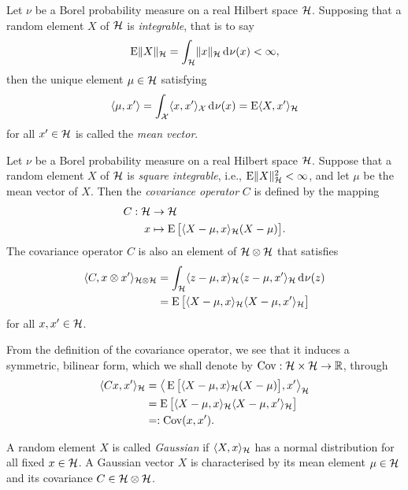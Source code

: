\begin{definition}
  Let $\nu$ be a Borel probability measure on a real Hilbert space ${\mathcal H}$.
  Supposing that a random element $X$ of ${\mathcal H}$ is \emph{integrable}, that is to say
  \[
    \operatorname{E} \lVert X\rVert_{\mathcal H} = \int_{\mathcal H} \lVert x\rVert_{\mathcal H} \operatorname{d}\hspace{0.5pt}\!\nu(x) < \infty,
  \]
  then the unique element $\mu\in{\mathcal H}$ satisfying 
  \[
    \langle\mu,x'\rangle = \int_{\mathcal X} \langle x,x'\rangle_{\mathcal X} \operatorname{d}\hspace{0.5pt}\!\nu(x) = \operatorname{E}\langle X,x'\rangle_{\mathcal H}
  \]
  for all $x' \in {\mathcal H}$ is called the \emph{mean vector}. 
\end{definition}

\begin{definition}
  Let $\nu$ be a Borel probability measure on a real Hilbert space ${\mathcal H}$.
  Suppose that a random element $X$ of ${\mathcal H}$ is \emph{square integrable}, i.e., $\operatorname{E} \lVert X\rVert_{\mathcal H}^2 < \infty$, and let $\mu$ be the mean vector of $X$.
  Then the \emph{covariance operator} $C$ is defined by the mapping
  \begin{align*}
    C:{\mathcal H} &\to {\mathcal H} \\
    x &\mapsto \operatorname{E}\big[\langle X - \mu, x\rangle_{{\mathcal H}}(X - \mu) \big].
  \end{align*}
  The covariance operator $C$ is also an element of ${\mathcal H}\otimes{\mathcal H}$ that satisfies
  \begin{align*}
    \langle C,x\otimes x'\rangle_{{\mathcal H}\otimes{\mathcal H}} 
    &= \int_{\mathcal H} \langle z-\mu, x\rangle_{\mathcal H}\langle z-\mu,x'\rangle_{\mathcal H} \operatorname{d}\hspace{0.5pt}\!\nu(z) \\
    &= \operatorname{E}\big[\langle X-\mu,x\rangle_{\mathcal H} \langle X-\mu,x'\rangle_{\mathcal H}\big]
  \end{align*}
  for all $x,x'\in{\mathcal H}$.
\end{definition}

From the definition of the covariance operator, we see that it induces a symmetric, bilinear form, which we shall denote by $\operatorname{Cov}:{\mathcal H}\times{\mathcal H}\to\mathbb{R}$, through
\begin{align*}
  \langle Cx,x'\rangle_{\mathcal H} 
  &= \big\langle\operatorname{E}\big[\langle X - \mu, x\rangle_{{\mathcal H}}(X - \mu) \big], x' \big\rangle_{\mathcal H} \\
  &= \operatorname{E}\big[\langle X-\mu,x\rangle_{\mathcal H} \langle X-\mu,x'\rangle_{\mathcal H}\big] \\
  &=: \operatorname{Cov}(x,x').
\end{align*}

\begin{definition}
  A random element $X$ is called \emph{Gaussian} if $\langle X,x\rangle_{\mathcal H}$ has a normal distribution for all fixed $x\in{\mathcal H}$.
  A Gaussian vector $X$ is characterised by its mean element $\mu\in{\mathcal H}$ and its covariance $C\in{\mathcal H}\otimes{\mathcal H}$.
\end{definition}





